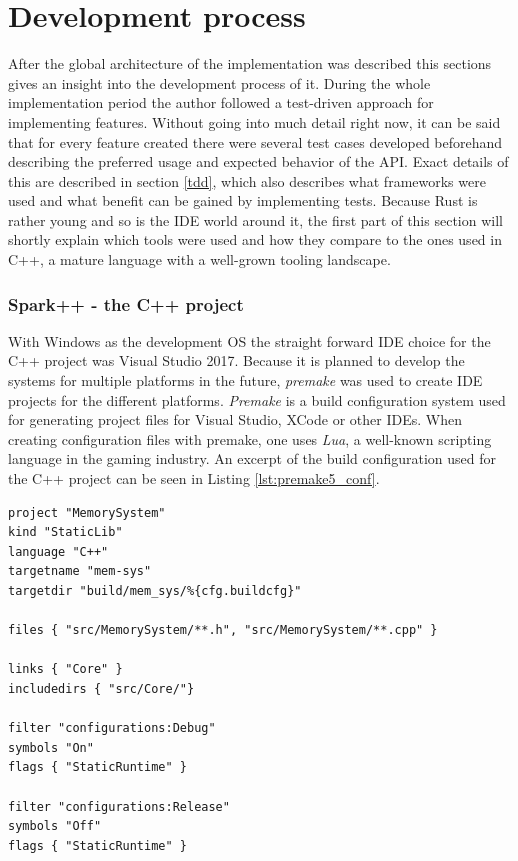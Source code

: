 \section{Development process}

After the global architecture of the implementation was described this sections gives an insight into the development process of it. During the whole implementation period the author followed a test-driven approach for implementing features. Without going into much detail right now, it can be said that for every feature created there were several test cases developed beforehand describing the preferred usage and expected behavior of the \ac{API}. Exact details of this are described in section \ref{tdd}, which also describes what frameworks were used and what benefit can be gained by implementing tests. Because Rust is rather young and so is the \ac{IDE} world around it, the first part of this section will shortly explain which tools were used and how they compare to the ones used in C++, a mature language with a well-grown tooling landscape.

\subsubsection{Spark++ - the C++ project}

With Windows as the development \ac{OS} the straight forward \ac{IDE} choice for the C++ project was Visual Studio 2017. Because it is planned to develop the systems for multiple platforms in the future, \textit{premake} was used to create \ac{IDE} projects for the different platforms. \textit{Premake} is a build configuration system used for generating project files for Visual Studio, XCode or other \acp{IDE}. When creating configuration files with premake, one uses \textit{Lua}, a well-known scripting language in the gaming industry. An excerpt of the build configuration used for the C++ project can be seen in Listing \ref{lst:premake5_conf}.\\

\begin{lstlisting}[caption={Part of the premake.lua file used to generate the Spark C++ project files}, label={lst:premake5_conf}, language={[5.0]Lua}]
project "MemorySystem"
kind "StaticLib"
language "C++"
targetname "mem-sys"
targetdir "build/mem_sys/%{cfg.buildcfg}"

files { "src/MemorySystem/**.h", "src/MemorySystem/**.cpp" }

links { "Core" }
includedirs { "src/Core/"}

filter "configurations:Debug"
symbols "On"
flags { "StaticRuntime" }

filter "configurations:Release"
symbols "Off"
flags { "StaticRuntime" }
\end{lstlisting}

